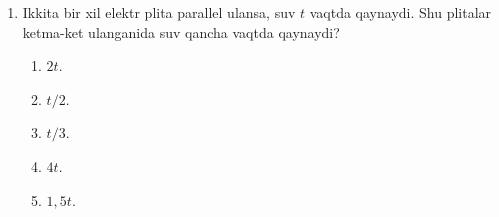 \begin{enumerate}
\item Ikkita bir xil elektr plita parallel ulansa, suv $t$ vaqtda qaynaydi. Shu plitalar ketma-ket ulanganida suv qancha vaqtda qaynaydi?
\begin{enumerate}[label=\Alph*)]
\item $2t$.
\item $t/2$.
\item $t/3$.
\item $4t$.
\item $1,5t$.
\end{enumerate}

\end{enumerate}

